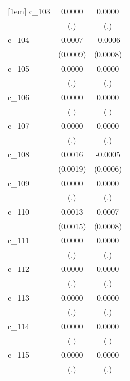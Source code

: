 {\begin{tabular}{l*{2}{c}}
[1em]
c\_103       &      0.0000        &      0.0000        \\
            &         (.)        &         (.)        \\
[1em]
c\_104       &      0.0007        &     -0.0006        \\
            &    (0.0009)        &    (0.0008)        \\
[1em]
c\_105       &      0.0000        &      0.0000        \\
            &         (.)        &         (.)        \\
[1em]
c\_106       &      0.0000        &      0.0000        \\
            &         (.)        &         (.)        \\
[1em]
c\_107       &      0.0000        &      0.0000        \\
            &         (.)        &         (.)        \\
[1em]
c\_108       &      0.0016        &     -0.0005        \\
            &    (0.0019)        &    (0.0006)        \\
[1em]
c\_109       &      0.0000        &      0.0000        \\
            &         (.)        &         (.)        \\
[1em]
c\_110       &      0.0013        &      0.0007        \\
            &    (0.0015)        &    (0.0008)        \\
[1em]
c\_111       &      0.0000        &      0.0000        \\
            &         (.)        &         (.)        \\
[1em]
c\_112       &      0.0000        &      0.0000        \\
            &         (.)        &         (.)        \\
[1em]
c\_113       &      0.0000        &      0.0000        \\
            &         (.)        &         (.)        \\
[1em]
c\_114       &      0.0000        &      0.0000        \\
            &         (.)        &         (.)        \\
[1em]
c\_115       &      0.0000        &      0.0000        \\
            &         (.)        &         (.)        \\

\end{tabular}}
